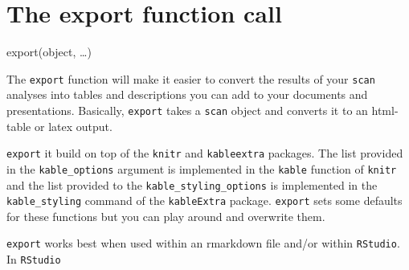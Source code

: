 \documentclass[
  letterpaper,
  DIV=11,
  numbers=noendperiod]{scrreprt}
\begin{document}
\begin{tcolorbox}[enhanced jigsaw, breakable, rightrule=.15mm, bottomrule=.15mm, arc=.35mm, colback=white, colframe=quarto-callout-tip-color-frame, opacityback=0, leftrule=.75mm, toprule=.15mm, left=2mm]
\begin{minipage}[t]{5.5mm}
\textcolor{quarto-callout-tip-color}{\faLightbulb}
\end{minipage}%
\begin{minipage}[t]{\textwidth - 5.5mm}


\hypertarget{the-export-function-call}{%
\chapter{The export function call}\label{the-export-function-call}}

export(object, \ldots)

\end{minipage}%
\end{tcolorbox}

The \texttt{export} function will make it easier to convert the results
of your \texttt{scan} analyses into tables and descriptions you can add
to your documents and presentations. Basically, \texttt{export} takes a
\texttt{scan} object and converts it to an html-table or latex output.

\begin{tcolorbox}[enhanced jigsaw, breakable, toptitle=1mm, colframe=quarto-callout-note-color-frame, arc=.35mm, titlerule=0mm, coltitle=black, rightrule=.15mm, bottomtitle=1mm, bottomrule=.15mm, colbacktitle=quarto-callout-note-color!10!white, title=\textcolor{quarto-callout-note-color}{\faInfo}\hspace{0.5em}{Note}, colback=white, opacitybacktitle=0.6, opacityback=0, leftrule=.75mm, toprule=.15mm, left=2mm]

\texttt{export} it build on top of the \texttt{knitr} and
\texttt{kableextra} packages. The list provided in the
\texttt{kable\_options} argument is implemented in the \texttt{kable}
function of \texttt{knitr} and the list provided to the
\texttt{kable\_styling\_options} is implemented in the
\texttt{kable\_styling} command of the \texttt{kableExtra} package.
\texttt{export} sets some defaults for these functions but you can play
around and overwrite them.

\end{tcolorbox}

\texttt{export} works best when used within an rmarkdown file and/or
within \texttt{RStudio}.\\
In \texttt{RStudio}
\end{document}
